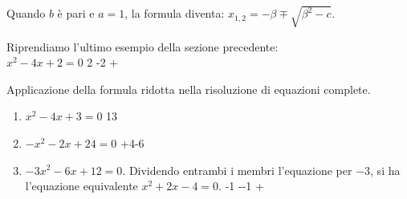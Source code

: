 Quando \(b\) è pari e \(a = 1\), la formula diventa: 
\(x_{1,2}=-\beta \mp \sqrt{\beta^2 -c}\).

\begin{esempio}{}{}
Riprendiamo l'ultimo esempio della sezione precedente: \\
\(x^2 -4 x +2=0\)
         {2 -}{2 +}
\end{esempio}

\begin{esempio}{}{}
Applicazione della formula ridotta nella risoluzione di equazioni complete.
\begin{enumerate}[left=0mm]
\item \(x^2 -4x +3=0\)
         {1}{3}
\item \(-x^2 -2x +24 = 0\)
         {+4}{-6}
\item \(-3 x^2 -6 x +12=0\). Dividendo entrambi i membri l'equazione per 
\(-3\), si ha l'equazione equivalente
\(x^2 +2x -4 = 0\). 
         {-1 -}{-1 +}
\end{enumerate}
\end{esempio}

% 

